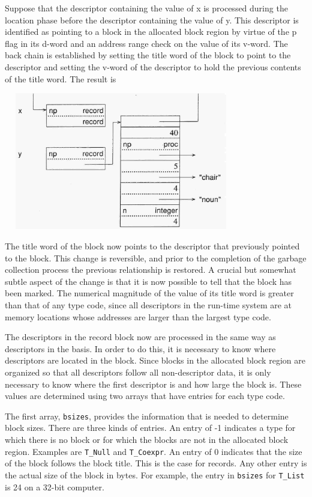 Suppose that the descriptor containing the value of x is processed
during the location phase before the descriptor containing the value
of y. This descriptor is identified as pointing to a block in the
allocated block region by virtue of the p flag in its d-word and an
address range check on the value of its v-word. The back chain is
established by setting the title word of the block to point to the
descriptor and setting the v-word of the descriptor to hold the
previous contents of the title word. The result is

\ \  \includegraphics[width=3.7402in,height=2.3571in]{ib-img/ib-img091.jpg} 

The title word of the block now points to the descriptor that
previously pointed to the block. This change is reversible, and prior
to the completion of the garbage collection process the previous
relationship is restored. A crucial but somewhat subtle aspect of the
change is that it is now possible to tell that the block has been
marked. The numerical magnitude of the value of its title word is
greater than that of any type code, since all descriptors in the
run-time system are at memory locations whose addresses are larger
than the largest type code.

The descriptors in the record block now are processed in the same way
as descriptors in the basis. In order to do this, it is necessary to
know where descriptors are located in the block. Since blocks in the
allocated block region are organized so that all descriptors follow
all non-descriptor data, it is only necessary to know where the first
descriptor is and how large the block is. These values are determined
using two arrays that have entries for each type code.

The first array, \texttt{bsizes}, provides the information that is
needed to determine block sizes. There are three kinds of entries. An
entry of -1 indicates a type for which there is no block or for which
the blocks are not in the allocated block region. Examples are
\texttt{T\_Null} and \texttt{T\_Coexpr}. An entry of 0 indicates that
the size of the block follows the block title. This is the case for
records. Any other entry is the actual size of the block in bytes. For
example, the entry in \texttt{bsizes} for \texttt{T\_List} is 24 on a
32-bit computer.

